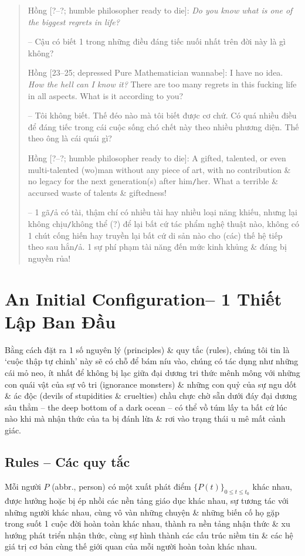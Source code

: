 \documentclass[12pt,oneside]{book}
\begin{document}
\begin{quote}
	{\sf Hồng [?--?; humble philosopher ready to die]}: {\it Do you know what is one of the biggest regrets in life?}
	
	-- Cậu có biết 1 trong những điều đáng tiếc nuối nhất trên đời này là gì không?
	
	{\sf Hồng [23--25; depressed Pure Mathematician wannabe]}: I have no idea. {\it How the hell can I know it?} There are too many regrets in this fucking life in all aspects. What is it according to you?
	
	-- Tôi không biết. Thế đéo nào mà tôi biết được cơ chứ. Có quá nhiều điều để đáng tiếc trong cái cuộc sống chó chết này theo nhiều phương diện. Thế theo ông là cái quái gì?
	
	{\sf Hồng [?--?; humble philosopher ready to die]}: A gifted, talented, or even multi-talented (wo)man without any piece of art, with no contribution \& no legacy for the next generation(s) after him{\tt/}her. What a terrible \& accursed waste of talents \& giftedness!
	
	-- 1 gã{\tt/}ả có tài, thậm chí có nhiều tài hay nhiều loại năng khiếu, nhưng lại không chịu{\tt/}không thể (?) để lại bất cứ tác phẩm nghệ thuật nào, không có 1 chút cống hiến hay truyền lại bất cứ di sản nào cho (các) thế hệ tiếp theo sau hắn{\tt/}ả. 1 sự phí phạm tài năng đến mức kinh khủng \& đáng bị nguyền rủa!
\end{quote}

\chapter{An Initial Configuration-- 1 Thiết Lập Ban Đầu}
\minitoc
Bằng cách đặt ra 1 số nguyên lý (principles) \& quy tắc (rules), chúng tôi tin là `cuộc thập tự chinh' này sẽ có chỗ để bám níu vào, chúng có tác dụng như những cái mỏ neo, ít nhất để không bị lạc giữa đại dương tri thức mênh mông với những con quái vật của sự vô tri (ignorance monsters) \& những con quỷ của sự ngu dốt \& ác độc (devils of stupidities \& cruelties) chầu chực chờ sẵn dưới đáy đại dương sâu thẳm -- the deep bottom of a dark ocean -- có thể vồ túm lấy ta bất cứ lúc nào khi mà nhận thức của ta bị đánh lừa \& rơi vào trạng thái u mê mất cảnh giác.

\section{Rules -- Các quy tắc}
Mỗi người $P$ (abbr., person) có một xuất phát điểm $\{P(t)\}_{0\le t\le t_0}$ khác nhau, được hưởng hoặc bị ép nhồi các nền tảng giáo dục khác nhau, sự tương tác với những người khác nhau, cùng vô vàn những chuyện \& những biến cố họ gặp trong suốt 1 cuộc đời hoàn toàn khác nhau, thành ra nền tảng nhận thức \& xu hướng phát triển nhận thức, cùng sự hình thành các cấu trúc niềm tin \& các hệ giá trị cơ bản cùng thế giới quan của mỗi người hoàn toàn khác nhau.
\end{document}
